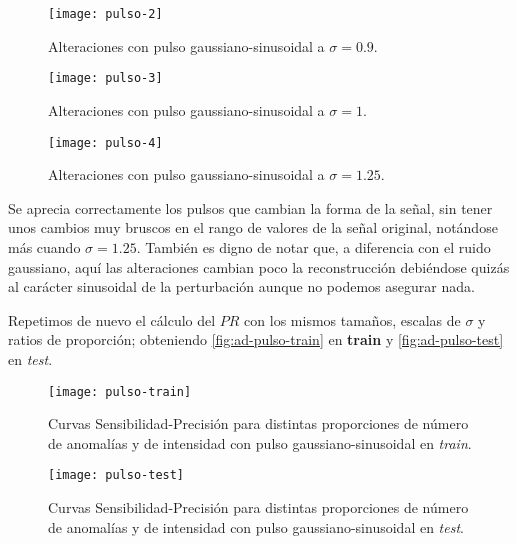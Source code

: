 \begin{figure}[htpb]
  \centering
  \texttt{[image: pulso-2]}
  \caption{Alteraciones con pulso gaussiano-sinusoidal a $\sigma = 0.9$.}
  \label{fig:ad-pulso-2}
\end{figure}

\begin{figure}[htpb]
  \centering
  \texttt{[image: pulso-3]}
  \caption{Alteraciones con pulso gaussiano-sinusoidal a $\sigma = 1$.}
  \label{fig:ad-pulso-3}
\end{figure}

\begin{figure}[htpb]
  \centering
  \texttt{[image: pulso-4]}
  \caption{Alteraciones con pulso gaussiano-sinusoidal a $\sigma = 1.25$.}
  \label{fig:ad-pulso-4}
\end{figure}

Se aprecia correctamente los pulsos que cambian la forma de la señal, sin tener unos cambios muy bruscos en el rango de valores de la señal original, notándose más cuando $\sigma = 1.25$. También es digno de notar que, a diferencia con el ruido gaussiano, aquí las alteraciones cambian poco la reconstrucción debiéndose quizás al carácter sinusoidal de la perturbación aunque no podemos asegurar nada.

Repetimos de nuevo el cálculo del $PR$ con los mismos tamaños, escalas de $\sigma$ y ratios de proporción; obteniendo \autoref{fig:ad-pulso-train} en \textbf{train} y \autoref{fig:ad-pulso-test} en \emph{test}.

\begin{figure}[htpb]
  \centering
  \texttt{[image: pulso-train]}
  \caption{Curvas Sensibilidad-Precisión para distintas proporciones de número de anomalías y de intensidad con pulso gaussiano-sinusoidal en \emph{train}.}
  \label{fig:ad-pulso-train}
\end{figure}

\begin{figure}[htpb]
  \centering
  \texttt{[image: pulso-test]}
  \caption{Curvas Sensibilidad-Precisión para distintas proporciones de número de anomalías y de intensidad con pulso gaussiano-sinusoidal en \emph{test}.}
  \label{fig:ad-pulso-test}
\end{figure}

